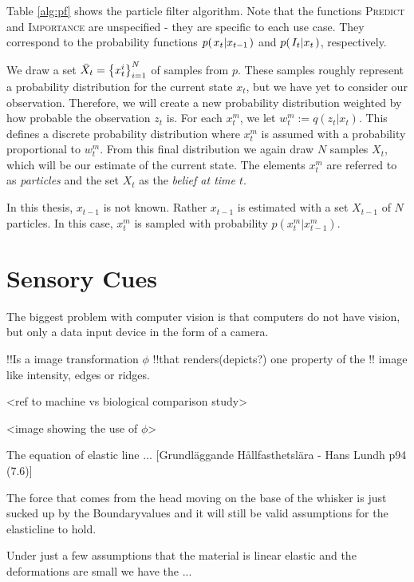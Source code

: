 Table \ref{alg:pf} shows the particle filter algorithm. Note that the functions \textsc{Predict} and \textsc{Importance} are unspecified - they are specific to each use case. They correspond to the probability functions $p{(\left. x_t \middle\vert x_{t-1} \right.)}$ and $p{(\left. I_t \middle\vert x_t \right.)}$, respectively.

We draw a set $\bar{X}_t = \left\{x_{t}^{i}\right\}_{i=1}^{N}$ of samples from $p$. These samples roughly represent a probability distribution for the current state $x_t$, but we have yet to consider our observation. Therefore, we will create a new probability distribution weighted by how probable the observation $z_t$ is. For each $x_t^m$, we let $w_t^m := q\left(z_t | x_t\right)$. This defines a discrete probability distribution where $x_t^m$ is assumed with a probability proportional to $w_t^m$. From this final distribution we again draw $N$ samples $X_t$, which will be our estimate of the current state. The elements $x_t^m$ are referred to as \emph{particles} and the set $X_t$ as the \emph{belief at time $t$}.

In this thesis, $x_{t-1}$ is not known. Rather $x_{t-1}$ is estimated with a set $X_{t-1}$ of $N$ particles. In this case, $x_t^m$ is sampled with probability $p\left(x_t^m | x_{t-1}^m\right)$.

\section{Sensory Cues}

The biggest problem with computer vision is that computers do not have
vision, but only a data input device in the form of a camera. 


!!Is a image transformation $\phi$ 
!!that renders(depicts?) one property of the
 !!   image like intensity, edges or ridges.

<ref to machine vs biological comparison study>


<image showing the use of $\phi$>



The equation of elastic line ... [Grundläggande Hållfasthetslära - Hans Lundh
p94 (7.6)]

The force that comes from the head moving on the base of the whisker is just 
sucked up by the Boundaryvalues and it will still be valid assumptions for the
elasticline to hold.

Under just a few assumptions that the material is linear elastic and the
deformations are small we have the ...



